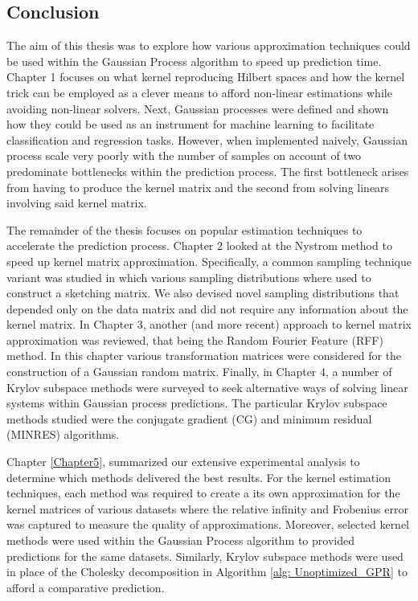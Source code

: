 \subsection{Conclusion}\label{Section5.4}

The aim of this thesis was to explore how various approximation techniques could be used within the Gaussian Process algorithm to speed up prediction time. Chapter 1 focuses on what kernel reproducing Hilbert spaces and how the kernel trick can be employed as a clever means to afford non-linear estimations while avoiding non-linear solvers. Next, Gaussian processes were defined and shown how they could be used as an instrument for machine learning to facilitate classification and regression tasks. However, when implemented naively, Gaussian process scale very poorly with the number of samples on account of two predominate bottlenecks within the prediction process. The first bottleneck arises from having to produce the kernel matrix and the second from solving linears involving said kernel matrix.

The remainder of the thesis focuses on popular estimation techniques to accelerate the prediction process. Chapter 2 looked at the Nystrom method to speed up kernel matrix approximation. Specifically, a common sampling technique variant was studied in which various sampling distributions where used to construct a sketching matrix. We also devised novel sampling distributions that depended only on the data matrix and did not require any information about the kernel matrix. In Chapter 3, another (and more recent) approach to kernel matrix approximation was reviewed, that being the Random Fourier Feature (RFF) method. In this chapter various transformation matrices were considered for the construction of a Gaussian random matrix. Finally, in Chapter 4, a number of Krylov subspace methods were surveyed to seek alternative ways of solving linear systems within Gaussian process predictions. The particular Krylov subspace methods studied were the conjugate gradient (CG) and minimum residual (MINRES) algorithms.

Chapter \ref{Chapter5}, summarized our extensive experimental analysis to determine which methods delivered the best results. For the kernel estimation techniques, each method was required to create a its own approximation for the kernel matrices of various datasets where the relative infinity and Frobenius error was captured to measure the quality of approximations. Moreover, selected kernel methods were used within the Gaussian Process algorithm to provided predictions for the same datasets. Similarly, Krylov subspace methods were used in place of the Cholesky decomposition in Algorithm \ref{alg: Unoptimized_GPR} to afford a comparative prediction.

